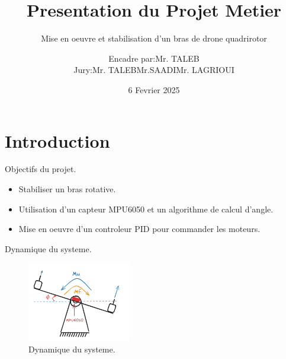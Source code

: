 \documentclass{beamer}
\title{Presentation du Projet Metier}
\subtitle{Mise en oeuvre et stabilisation d'un bras de drone quadrirotor}
\author{Encadre par:\hspace*{.3cm}Mr. TALEB\\Jury:\hspace*{.3cm}Mr. TALEB\hspace*{.3cm}Mr.SAADI\hspace*{.3cm}Mr. LAGRIOUI}
\date{6 Fevrier 2025}
\newcommand{\hrefcol}[2]{\textcolor{cyan}{\href{#1}{#2}}}
\begin{document}
\maketitle







\section{Introduction}

\begin{frame}{Objectifs du projet.}
	\begin{itemize}
		\item Stabiliser un bras rotative.
		\item Utilisation d'un capteur MPU6050 et un algorithme de calcul d'angle.
		\item Mise en oeuvre d'un controleur PID pour commander les moteurs.
	\end{itemize}
	\end{frame}

	\begin{frame}{Dynamique du systeme.}
		\begin{figure}
			\centering
			\includegraphics[width=0.4\textwidth]{assets/moments.png}
			\caption{Dynamique du systeme.}
		\end{figure}
	\end{frame}
\end{document}
